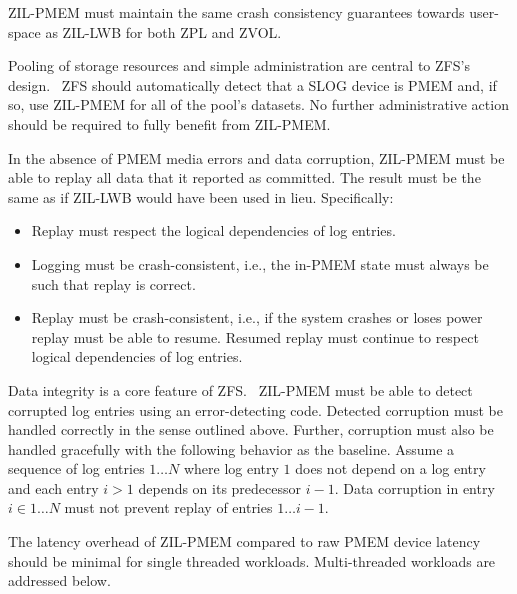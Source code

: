 \documentclass[12pt,a4paper,twoside,draft]{book}
\begin{document}
ZIL-PMEM must maintain the same crash consistency guarantees towards user-space as ZIL-LWB for both ZPL and ZVOL.

Pooling of storage resources and simple administration are central to ZFS's design.~\cite{zfspaper}
ZFS should automatically detect that a SLOG device is PMEM and, if so, use ZIL-PMEM for all of the pool’s datasets.
No further administrative action should be required to fully benefit from ZIL-PMEM.

In the absence of PMEM media errors and data corruption, ZIL-PMEM must be able to replay all data that it reported as committed.
The result must be the same as if ZIL-LWB would have been used in lieu.
Specifically:
\begin{itemize}[noitemsep,beginpenalty=100000,midpenalty=100000]
    \item Replay must respect the logical dependencies of log entries.
    \item Logging must be crash-consistent, i.e., the in-PMEM state must always be such that replay is correct.
    \item Replay must be crash-consistent, i.e., if the system crashes or loses power replay must be able to resume. Resumed replay must continue to respect logical dependencies of log entries.
\end{itemize}

Data integrity is a core feature of ZFS.~\cite{zfspaper}
ZIL-PMEM must be able to detect corrupted log entries using an error-detecting code.
Detected corruption must be handled correctly in the sense outlined above.
Further, corruption must also be handled gracefully with the following behavior as the baseline.
Assume a sequence of log entries $1 \dots N$ where log entry $1$ does not depend on a log entry and each entry $i > 1$ depends on its predecessor $i-1$.
Data corruption in entry $i \in 1 \dots N$ must not prevent replay of entries $1 \dots i-1$.

The latency overhead of ZIL-PMEM compared to raw PMEM device latency should be minimal for single threaded workloads.
Multi-threaded workloads are addressed below.
\end{document}
